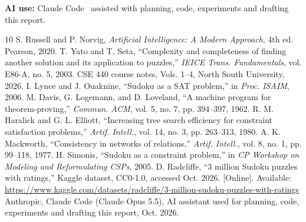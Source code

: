 \documentclass[conference]{IEEEtran}
\begin{document}
\noindent\textbf{AI use:} Claude Code~\cite{claude} assisted with planning, code, experiments and drafting this report.

\begin{thebibliography}{10}
\footnotesize
{} S. Russell and P. Norvig, \emph{Artificial Intelligence: A Modern Approach}, 4th ed. Pearson, 2020.
 T. Yato and T. Seta, ``Complexity and completeness of finding another solution and its application to puzzles,'' \emph{IEICE Trans. Fundamentals}, vol. E86-A, no. 5, 2003.
 CSE 440 course notes, Vols. 1--4, North South University, 2026.
 I. Lynce and J. Ouaknine, ``Sudoku as a SAT problem,'' in \emph{Proc. ISAIM}, 2006.
 M. Davis, G. Logemann, and D. Loveland, ``A machine program for theorem-proving,'' \emph{Commun. ACM}, vol. 5, no. 7, pp. 394--397, 1962.
 R. M. Haralick and G. L. Elliott, ``Increasing tree search efficiency for constraint satisfaction problems,'' \emph{Artif. Intell.}, vol. 14, no. 3, pp. 263--313, 1980.
 A. K. Mackworth, ``Consistency in networks of relations,'' \emph{Artif. Intell.}, vol. 8, no. 1, pp. 99--118, 1977.
 H. Simonis, ``Sudoku as a constraint problem,'' in \emph{CP Workshop on Modeling and Reformulating CSPs}, 2005.
 D. Radcliffe, ``3 million Sudoku puzzles with ratings,'' Kaggle dataset, CC0-1.0, accessed Oct. 2026. [Online]. Available: \url{https://www.kaggle.com/datasets/radcliffe/3-million-sudoku-puzzles-with-ratings}
 Anthropic, Claude Code (Claude Opus 5.5), AI assistant used for planning, code, experiments and drafting this report, Oct. 2026.
\end{thebibliography}
\end{document}
